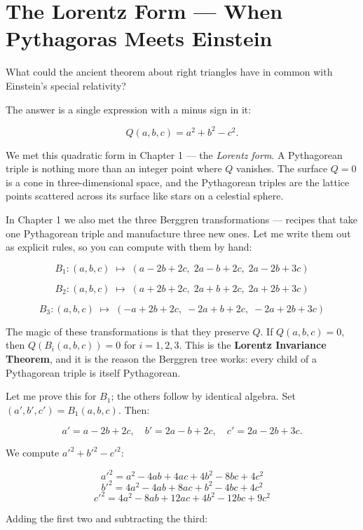 \section{The Lorentz Form --- When Pythagoras Meets Einstein}\label{ch4-the-lorentz-form-when-pythagoras-meets-einstein}

What could the ancient theorem about right triangles have in common with Einstein's special relativity?

The answer is a single expression with a minus sign in it:

\[Q(a, b, c) = a^2 + b^2 - c^2.\]

We met this quadratic form in Chapter 1 --- the \emph{Lorentz form}. A Pythagorean triple is nothing more than an integer point where \(Q\) vanishes. The surface \(Q = 0\) is a cone in three-dimensional space, and the Pythagorean triples are the lattice points scattered across its surface like stars on a celestial sphere.

In Chapter 1 we also met the three Berggren transformations --- recipes that take one Pythagorean triple and manufacture three new ones. Let me write them out as explicit rules, so you can compute with them by hand:

\[B_1: (a, b, c) \;\longmapsto\; (a - 2b + 2c,\; 2a - b + 2c,\; 2a - 2b + 3c)\]

\[B_2: (a, b, c) \;\longmapsto\; (a + 2b + 2c,\; 2a + b + 2c,\; 2a + 2b + 3c)\]

\[B_3: (a, b, c) \;\longmapsto\; (-a + 2b + 2c,\; -2a + b + 2c,\; -2a + 2b + 3c)\]

The magic of these transformations is that they preserve \(Q\). If \(Q(a, b, c) = 0\), then \(Q(B_i(a, b, c)) = 0\) for \(i = 1, 2, 3\). This is the \textbf{Lorentz Invariance Theorem}, and it is the reason the Berggren tree works: every child of a Pythagorean triple is itself Pythagorean.

Let me prove this for \(B_1\); the others follow by identical algebra. Set \((a', b', c') = B_1(a, b, c)\). Then:

\[a' = a - 2b + 2c, \quad b' = 2a - b + 2c, \quad c' = 2a - 2b + 3c.\]

We compute \(a'^2 + b'^2 - c'^2\):

\[a'^2 = a^2 - 4ab + 4ac + 4b^2 - 8bc + 4c^2\] \[b'^2 = 4a^2 - 4ab + 8ac + b^2 - 4bc + 4c^2\] \[c'^2 = 4a^2 - 8ab + 12ac + 4b^2 - 12bc + 9c^2\]

Adding the first two and subtracting the third:

